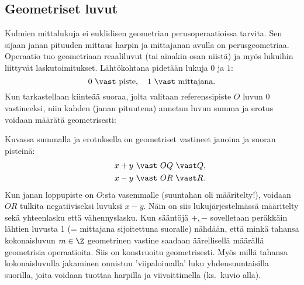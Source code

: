 \subsection*{Geometriset luvut}
%

Kulmien mittalukuja ei euklidisen geometrian perusoperaatioissa tarvita. Sen sijaan janan 
pituuden mittaus harpin ja mittajanan avulla on perusgeometriaa. Operaatio tuo geometriaan 
reaaliluvut (tai ainakin osan niistä) ja myös lukuihin liittyvät laskutoimitukset.
Lähtökohtana pidetään lukuja $0$ ja $1$:
\[
0\ \vast\ \text{piste}, \quad 1\ \vast\ \text{mittajana}.
\]
Kun tarkastellaan kiinteää suoraa, jolta valitaan referenssipiste $O$ luvun $0$ vastineeksi, 
niin kahden (janan pituutena) annetun luvun summa ja erotus voidaan määrätä geometrisesti:
\begin{figure}[htb]
\begin{center}
\end{center}
\end{figure}

Kuvassa summalla ja erotuksella on geometriset vastineet janoina ja suoran pisteinä:
\begin{align*}
\qquad &x+y\ \vast\ OQ\ \vast Q,  \\
\qquad &x-y\ \vast\ OR\ \vast R.
\end{align*}
Kun janan loppupiste on $O$:sta vasemmalle (suuntahan oli määritelty!), voidaan $OR$ tulkita 
negatiiviseksi luvuksi $x-y$. Näin on siis lukujärjestelmässä määritelty sekä yhteenlasku että
vähennyslasku. Kun sääntöjä $+,-$ sovelletaan peräkkäin lähtien luvusta 1 (= mittajana
sijoitettuna suoralle) nähdään, että minkä tahansa kokonaisluvun $m\in{\Z}$ geometrinen vastine
saadaan äärellisellä määrällä geometrisia operaatioita. Siis {\Z} on konstruoitu geometrisesti.
Myös millä tahansa kokonaisluvulla jakaminen onnistuu 'viipaloimalla' luku yhdensuuntaisilla 
suorilla, joita voidaan  tuottaa harpilla ja viivoittimella (ks.\ kuvio alla).
\begin{figure}[htb]
\begin{center}
\end{center}
\end{figure}

\pagebreak

